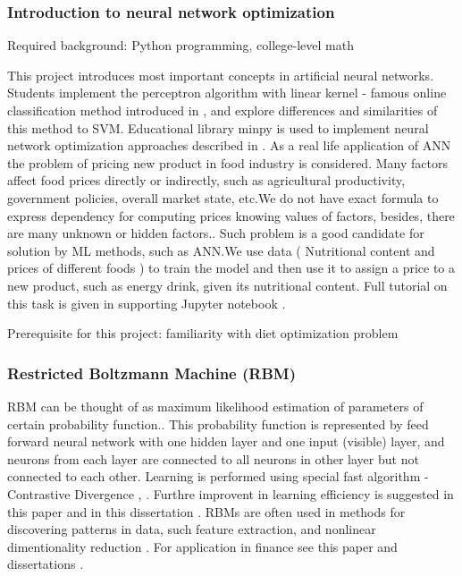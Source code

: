 \documentclass{article} %
\begin{document}
  \subsubsection{Introduction to neural network optimization}



Required background: Python programming, college-level math

This project introduces most important concepts in artificial neural networks.
Students implement the perceptron algorithm with linear kernel - famous online classification method introduced in  \cite{ABR}, and explore differences and similarities of this method to SVM. Educational library minpy  \cite{MP} is used to implement neural network optimization approaches described in \cite{YZWQ,YZWQ1,KP1}.
As a real life application of ANN the problem of pricing new product in food industry is considered. Many factors affect food prices directly or indirectly, such as agricultural productivity, government policies, overall market state, etc.We do not have exact formula to express dependency for computing prices knowing values of factors, besides, there are many unknown or hidden factors.. Such problem is a good candidate for solution by ML methods, such as ANN.We use data ( Nutritional content and prices of different foods ) to train the model and then use it to assign a price to a new product, such as energy drink, given its nutritional content. Full tutorial on this task is given in supporting Jupyter notebook \cite{anndemo}.

Prerequisite for this project: familiarity with diet optimization problem


 \subsubsection{Restricted Boltzmann Machine (RBM)}


RBM can be thought of as maximum likelihood estimation of parameters of certain probability  function.. This probability function is represented by feed forward neural network with one hidden layer and one input (visible) layer,  and neurons from each layer are connected to all neurons in other layer but not connected to each other. Learning is performed using   special fast algorithm -  Contrastive Divergence  \cite{HNT},  \cite{ST}.  Furthre improvent in learning efficiency is suggested in this paper \cite{MR} and in this dissertation \cite{HHH}. RBMs  are often used in methods for discovering patterns in data, such feature extraction, and nonlinear dimentionality reduction \cite{BKMM} . For application in finance see this paper \cite{APC} and dissertations \cite{FH,HR}. 
\end{document}
